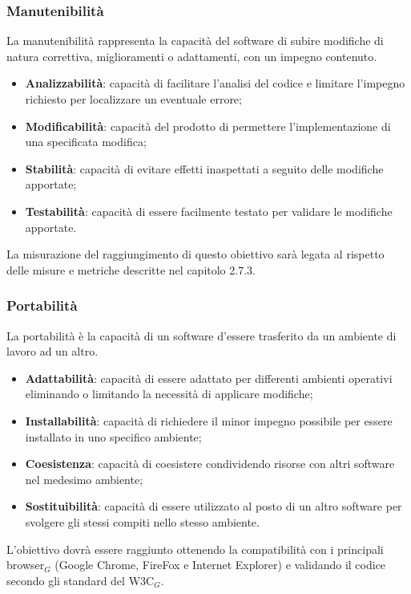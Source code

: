 \subsubsection{Manutenibilità}
La manutenibilità rappresenta la capacità del software di subire modifiche di natura correttiva, miglioramenti o adattamenti, con un impegno contenuto.
\begin{itemize}
	\item \textbf{Analizzabilità}: capacità di facilitare l'analisi del codice e limitare l'impegno richiesto per localizzare un eventuale errore;
	\item \textbf{Modificabilità}: capacità del prodotto di permettere l'implementazione di una specificata modifica;
	\item \textbf{Stabilità}: capacità di evitare effetti inaspettati a seguito delle modifiche apportate;
	\item \textbf{Testabilità}: capacità di essere facilmente testato per validare le modifiche apportate.
\end{itemize}
La misurazione del raggiungimento di questo obiettivo sarà legata al rispetto
delle misure e metriche descritte nel capitolo 2.7.3.
\subsubsection{Portabilità}
La portabilità è la capacità di un software d'essere trasferito da un ambiente di
lavoro ad un altro.
\begin{itemize}
	\item \textbf{Adattabilità}: capacità di essere adattato per differenti ambienti operativi eliminando o limitando la necessità di applicare modifiche;
	\item \textbf{Installabilità}: capacità di richiedere il minor impegno possibile per essere installato in uno specifico ambiente;
	\item \textbf{Coesistenza}: capacità di coesistere condividendo risorse con altri software nel medesimo ambiente;
	\item \textbf{Sostituibilità}: capacità di essere utilizzato al posto di un altro software per svolgere gli stessi compiti nello stesso ambiente.
\end{itemize}
L'obiettivo dovrà essere raggiunto ottenendo la compatibilità con i principali browser$_G$ (Google Chrome, FireFox e Internet Explorer) e validando il codice secondo gli standard del W3C$_G$.
